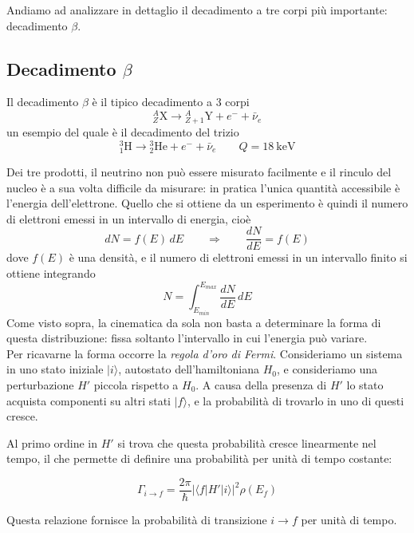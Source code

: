Andiamo ad analizzare in dettaglio il decadimento a tre corpi più importante: decadimento $\beta$. 

\newpage

\subsection{Decadimento $\beta$}

Il decadimento $\beta$ è il tipico decadimento a $3$ corpi
%
\begin{equation*}
    {}^{A}_{Z}\mathrm{X} \longrightarrow {}^{A}_{Z+1}\mathrm{Y} + e^- + \bar{\nu}_e
\end{equation*}
un esempio del quale è il decadimento del trizio
%
\begin{equation*}
    {}^{3}_{1}\mathrm{H} \longrightarrow {}^{3}_{2}\mathrm{He} + e^- + \bar{\nu}_e \qquad Q = 18 \ \mathrm{keV}
\end{equation*}

Dei tre prodotti, il neutrino non può essere misurato facilmente e il rinculo del nucleo è a sua volta difficile da misurare: in pratica l'unica quantità accessibile è l'energia dell'elettrone. Quello che si ottiene da un esperimento è quindi il numero di elettroni emessi in un intervallo di energia, cioè
%
\begin{equation}
    dN = f(E) \, dE \qquad \Longrightarrow \qquad \frac{dN}{dE} = f(E)
\end{equation}
dove $f(E)$ è una densità, e il numero di elettroni emessi in un intervallo finito si ottiene integrando
%
\begin{equation*}
    N = \int_{E_{min}}^{E_{max}} \frac{dN}{dE} \, dE
\end{equation*}
Come visto sopra, la cinematica da sola non basta a determinare la forma di questa distribuzione: fissa soltanto l'intervallo in cui l'energia può variare. \\

Per ricavarne la forma occorre la \emph{regola d'oro di Fermi}. Consideriamo un sistema in uno stato iniziale $|i\rangle$, autostato dell'hamiltoniana $H_0$, e consideriamo una perturbazione $H'$ piccola rispetto a $H_0$. A causa della presenza di $H'$ lo stato acquista componenti su altri stati $|f\rangle$, e la probabilità di trovarlo in uno di questi cresce.

Al primo ordine in $H'$ si trova che questa probabilità cresce linearmente nel tempo, il che permette di definire una probabilità per unità di tempo costante:
%
\begin{tcolorbox}[colback=black!5!white, colframe=black!45!white, boxrule=0.8pt]
\begin{equation}
    \Gamma_{i \to f} = \frac{2\pi}{\hbar} \left| \langle f | H' | i \rangle \right|^2 \rho(E_f)
\end{equation}
\end{tcolorbox}
Questa relazione fornisce la probabilità di transizione $i \to f$ per unità di tempo. 


